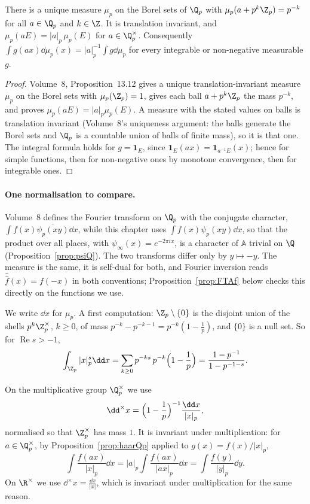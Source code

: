 \begin{proposition}\label{prop:haarQp}
There is a unique measure $\mu_p$ on the Borel sets of $\Q_p$ with $\mu_p(a+p^k\Z_p)=p^{-k}$ for all $a\in\Q_p$ and $k\in\Z$.
It is translation invariant, and $\mu_p(aE)=|a|_p\,\mu_p(E)$ for $a\in\Q_p^\times$. Consequently
$\int g(ax)\dd\mu_p(x)=|a|_p^{-1}\int g\dd\mu_p$ for every integrable or non-negative measurable $g$.
\end{proposition}
\begin{proof}
Volume~8, Proposition~13.12 gives a unique translation-invariant measure $\mu_p$ on the Borel sets with $\mu_p(\Z_p)=1$, gives
each ball $a+p^k\Z_p$ the mass $p^{-k}$, and proves $\mu_p(aE)=|a|_p\mu_p(E)$. A measure with the stated values on balls is
translation invariant (Volume~8's uniqueness argument: the balls generate the Borel sets and $\Q_p$ is a countable union of
balls of finite mass), so it is that one. The integral formula holds for $g=\mathbf 1_E$, since $\mathbf 1_E(ax)=\mathbf
1_{a^{-1}E}(x)$; hence for simple functions, then for non-negative ones by monotone convergence, then for integrable ones.
\end{proof}

\paragraph{One normalisation to compare.} Volume~8 defines the Fourier transform on $\Q_p$ with the conjugate character,
$\int f(x)\overline{\psi_p(xy)}\dd x$, while this chapter uses $\int f(x)\psi_p(xy)\dd x$, so that the product over all places,
with $\psi_\infty(x)=e^{-2\pi ix}$, is a character of $\mathbb A$ trivial on $\Q$ (Proposition~\ref{prop:psiQ}). The two transforms
differ only by $y\mapsto-y$. The measure is the same, it is self-dual for both, and Fourier inversion reads $\hat{\hat f}(x)=f(-x)$
in both conventions; Proposition~\ref{prop:FTAf} below checks this directly on the functions we use.

We write $\dd x$ for $\mu_p$. A first computation: $\Z_p\setminus\{0\}$ is the disjoint union of the shells $p^k\Z_p^\times$, $k\ge0$,
of mass $p^{-k}-p^{-k-1}=p^{-k}(1-\frac1p)$, and $\{0\}$ is a null set. So for $\operatorname{Re}s>-1$,
\begin{equation}\label{eq:Zpabs}
\int_{\Z_p}|x|_p^s\dd x=\sum_{k\ge0}p^{-ks}\,p^{-k}\Bigl(1-\frac1p\Bigr)=\frac{1-p^{-1}}{1-p^{-1-s}}.
\end{equation}

On the multiplicative group $\Q_p^\times$ we use
\[
\dd^\times x=\Bigl(1-\frac1p\Bigr)^{-1}\frac{\dd x}{|x|_p},
\]
normalised so that $\Z_p^\times$ has mass $1$. It is invariant under multiplication: for $a\in\Q_p^\times$, by
Proposition~\ref{prop:haarQp} applied to $g(x)=f(x)/|x|_p$,
\[
\int\frac{f(ax)}{|x|_p}\dd x=|a|_p\int\frac{f(ax)}{|ax|_p}\dd x=\int\frac{f(y)}{|y|_p}\dd y.
\]
On $\R^\times$ we use $\dd^\times x=\frac{\dd x}{|x|}$, which is invariant under multiplication for the same reason.

